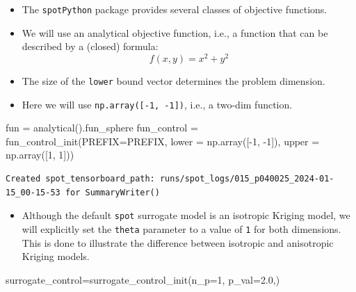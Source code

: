 \documentclass[
  letterpaper,
  DIV=11,
  numbers=noendperiod]{scrreprt}
\newenvironment{Shaded}{\begin{snugshade}}{\end{snugshade}}
\newcommand{\DecValTok}[1]{\textcolor[rgb]{0.68,0.00,0.00}{#1}}
\newcommand{\FloatTok}[1]{\textcolor[rgb]{0.68,0.00,0.00}{#1}}
\newcommand{\NormalTok}[1]{\textcolor[rgb]{0.00,0.23,0.31}{#1}}
\newcommand{\OperatorTok}[1]{\textcolor[rgb]{0.37,0.37,0.37}{#1}}
\providecommand{\tightlist}{%
  \setlength{\itemsep}{0pt}\setlength{\parskip}{0pt}}\usepackage{longtable,booktabs,array}
\begin{document}
\begin{itemize}
\tightlist
\item
  The \texttt{spotPython} package provides several classes of objective
  functions.
\item
  We will use an analytical objective function, i.e., a function that
  can be described by a (closed) formula: \[f(x, y) = x^2 + y^2\]
\item
  The size of the \texttt{lower} bound vector determines the problem
  dimension.
\item
  Here we will use \texttt{np.array({[}-1,\ -1{]})}, i.e., a two-dim
  function.
\end{itemize}

\begin{Shaded}
\begin{Highlighting}[]
\NormalTok{fun }\OperatorTok{=}\NormalTok{ analytical().fun\_sphere}
\NormalTok{fun\_control }\OperatorTok{=}\NormalTok{ fun\_control\_init(PREFIX}\OperatorTok{=}\NormalTok{PREFIX,}
\NormalTok{                               lower }\OperatorTok{=}\NormalTok{ np.array([}\OperatorTok{{-}}\DecValTok{1}\NormalTok{, }\OperatorTok{{-}}\DecValTok{1}\NormalTok{]),}
\NormalTok{                               upper }\OperatorTok{=}\NormalTok{ np.array([}\DecValTok{1}\NormalTok{, }\DecValTok{1}\NormalTok{]))}
\end{Highlighting}
\end{Shaded}

\begin{verbatim}
Created spot_tensorboard_path: runs/spot_logs/015_p040025_2024-01-15_00-15-53 for SummaryWriter()
\end{verbatim}

\begin{itemize}
\tightlist
\item
  Although the default \texttt{spot} surrogate model is an isotropic
  Kriging model, we will explicitly set the \texttt{theta} parameter to
  a value of \texttt{1} for both dimensions. This is done to illustrate
  the difference between isotropic and anisotropic Kriging models.
\end{itemize}

\begin{Shaded}
\begin{Highlighting}[]
\NormalTok{surrogate\_control}\OperatorTok{=}\NormalTok{surrogate\_control\_init(n\_p}\OperatorTok{=}\DecValTok{1}\NormalTok{,}
\NormalTok{                                         p\_val}\OperatorTok{=}\FloatTok{2.0}\NormalTok{,)}
\end{Highlighting}
\end{Shaded}
\end{document}

